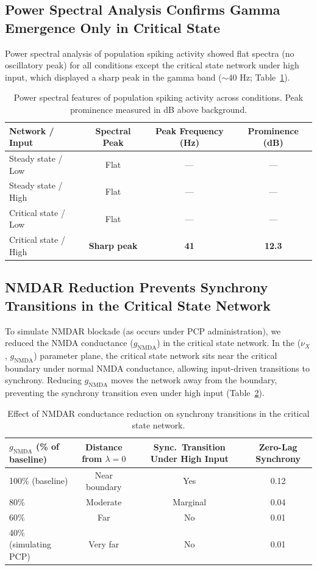 \documentclass[11pt]{article}
\begin{document}
\subsection{Power Spectral Analysis Confirms Gamma Emergence Only in Critical State}

Power spectral analysis of population spiking activity showed flat spectra (no oscillatory peak) for all conditions except the critical state network under high input, which displayed a sharp peak in the gamma band ($\sim$40 Hz; Table~\ref{tab:spectra}).

\begin{table}[H]
\centering
\caption{Power spectral features of population spiking activity across conditions. Peak prominence measured in dB above background.}
\label{tab:spectra}
\begin{tabular}{lccc}
\toprule
\textbf{Network / Input} & \textbf{Spectral Peak} & \textbf{Peak Frequency (Hz)} & \textbf{Prominence (dB)} \\
\midrule
Steady state / Low & Flat & --- & --- \\
Steady state / High & Flat & --- & --- \\
Critical state / Low & Flat & --- & --- \\
Critical state / High & \textbf{Sharp peak} & \textbf{41} & \textbf{12.3} \\
\bottomrule
\end{tabular}
\end{table}

\subsection{NMDAR Reduction Prevents Synchrony Transitions in the Critical State Network}

To simulate NMDAR blockade (as occurs under PCP administration), we reduced the NMDA conductance ($g_{\mathrm{NMDA}}$) in the critical state network. In the ($\nu_X$, $g_{\mathrm{NMDA}}$) parameter plane, the critical state network sits near the critical boundary under normal NMDA conductance, allowing input-driven transitions to synchrony. Reducing $g_{\mathrm{NMDA}}$ moves the network away from the boundary, preventing the synchrony transition even under high input (Table~\ref{tab:nmda_reduction}).

\begin{table}[H]
\centering
\caption{Effect of NMDAR conductance reduction on synchrony transitions in the critical state network.}
\label{tab:nmda_reduction}
\begin{tabular}{lccc}
\toprule
\textbf{$g_{\mathrm{NMDA}}$ (\% of baseline)} & \textbf{Distance from $\lambda = 0$} & \textbf{Sync.\ Transition Under High Input} & \textbf{Zero-Lag Synchrony} \\
\midrule
100\% (baseline) & Near boundary & Yes & 0.12 \\
80\% & Moderate & Marginal & 0.04 \\
60\% & Far & No & 0.01 \\
40\% (simulating PCP) & Very far & No & 0.01 \\
\bottomrule
\end{tabular}
\end{table}
\end{document}
